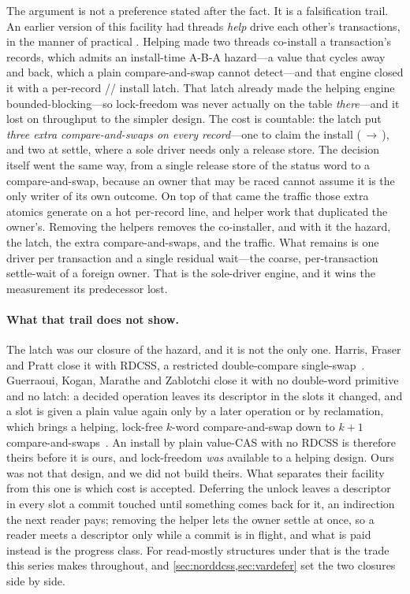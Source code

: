 \documentclass[11pt]{article}
\begin{document}
The argument is not a preference stated after the fact. It is a falsification
trail. An earlier version of this facility had threads \emph{help} drive each
other's transactions, in the manner of practical \mcas
\citep{harris2002mcas, barnes1993method}. Helping made two threads co-install a
transaction's records, which admits an install-time A-B-A hazard---a value that
cycles away and back, which a plain compare-and-swap cannot detect---and that
engine closed it with a per-record // install
latch. That latch already made the helping engine bounded-blocking---so
lock-freedom was never actually on the table \emph{there}---and it lost on
throughput to the simpler design.
The cost is countable: the latch put \emph{three extra
compare-and-swaps on every record}---one to claim the install
(\,$\to$\,), and two at settle, where a sole driver needs
only a release store. The decision itself went the same way, from
a single release store of the status word to a compare-and-swap, because an
owner that may be raced cannot assume it is the only writer of its own outcome.
On top of that came the traffic those extra atomics generate on a hot per-record
line, and helper work that duplicated the owner's. Removing the helpers removes
the co-installer, and with it the hazard, the latch, the extra compare-and-swaps,
and the traffic. What remains is one driver per
transaction and a single residual wait---the coarse, per-transaction settle-wait
of a foreign owner. That is the sole-driver engine, and it wins the measurement
its predecessor lost.

\paragraph{What that trail does not show.} The latch was our closure of the
hazard, and it is not the only one. Harris, Fraser and Pratt close it with
RDCSS, a restricted double-compare single-swap~\citep{harris2002mcas}. Guerraoui,
Kogan, Marathe and Zablotchi close it with no double-word primitive and no
latch: a decided operation leaves its descriptor in the slots it changed, and a
slot is given a plain value again only by a later operation or by reclamation,
which brings a helping, lock-free $k$-word compare-and-swap down to $k+1$
compare-and-swaps~\citep{guerraoui2020mcas}. An install by plain value-CAS with
no RDCSS is therefore theirs before it is ours, and lock-freedom \emph{was}
available to a helping design. Ours was not that design, and we did not build
theirs. What separates their facility from this one is which cost is accepted.
Deferring the unlock leaves a descriptor in every slot a commit touched until
something comes back for it, an indirection the next reader pays; removing the
helper lets the owner settle at once, so a reader meets a descriptor only while
a commit is in flight, and what is paid instead is the progress class. For
read-mostly structures under \rcu that is the trade this series makes throughout,
and \cref{sec:norddcss,sec:vardefer} set the two closures side by side.
\end{document}
